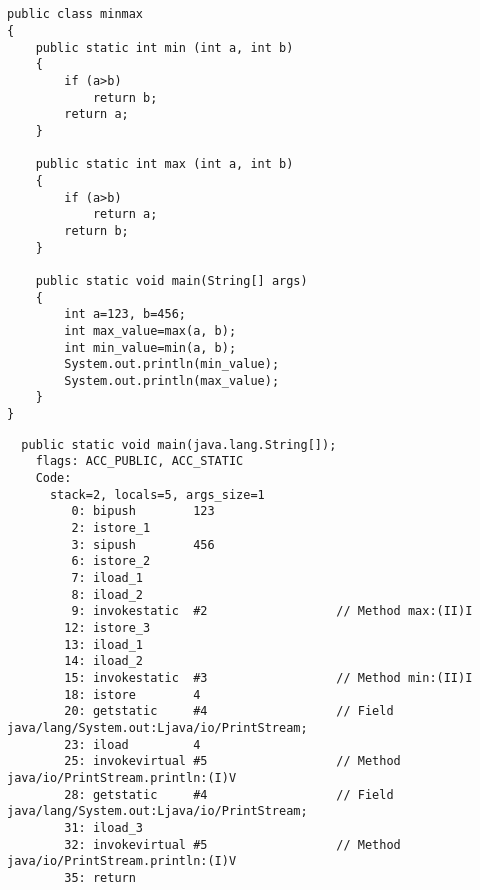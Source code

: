 \subsection{}


\begin{lstlisting}
public class minmax
{
	public static int min (int a, int b)
	{
		if (a>b)
			return b;
		return a;
	}

	public static int max (int a, int b)
	{
		if (a>b)
			return a;
		return b;
	}

	public static void main(String[] args)
	{
		int a=123, b=456;
		int max_value=max(a, b);
		int min_value=min(a, b);
		System.out.println(min_value);
		System.out.println(max_value);
	}
}
\end{lstlisting}


\begin{lstlisting}
  public static void main(java.lang.String[]);
    flags: ACC_PUBLIC, ACC_STATIC
    Code:
      stack=2, locals=5, args_size=1
         0: bipush        123
         2: istore_1      
         3: sipush        456
         6: istore_2      
         7: iload_1       
         8: iload_2       
         9: invokestatic  #2                  // Method max:(II)I
        12: istore_3      
        13: iload_1       
        14: iload_2       
        15: invokestatic  #3                  // Method min:(II)I
        18: istore        4
        20: getstatic     #4                  // Field java/lang/System.out:Ljava/io/PrintStream;
        23: iload         4
        25: invokevirtual #5                  // Method java/io/PrintStream.println:(I)V
        28: getstatic     #4                  // Field java/lang/System.out:Ljava/io/PrintStream;
        31: iload_3       
        32: invokevirtual #5                  // Method java/io/PrintStream.println:(I)V
        35: return        
\end{lstlisting}


